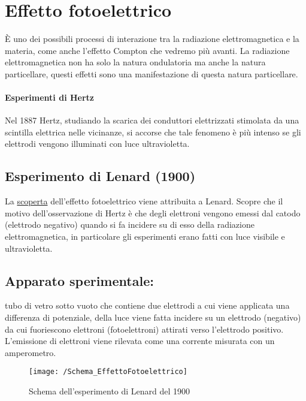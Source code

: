 

\section{Effetto fotoelettrico}
È uno dei possibili processi di interazione tra la radiazione elettromagnetica e la materia, come anche l'effetto Compton che vedremo più avanti. La radiazione elettromagnetica non ha solo la natura ondulatoria ma anche la natura particellare, questi effetti sono una manifestazione di questa natura particellare.

\paragraph{Esperimenti di Hertz}
Nel 1887 Hertz, studiando la scarica dei conduttori elettrizzati stimolata da una scintilla elettrica nelle vicinanze,
si accorse che tale fenomeno è più intenso se gli elettrodi vengono illuminati con luce ultravioletta.

\subsection{Esperimento di Lenard (1900)}
La \underline{scoperta} dell'effetto fotoelettrico viene attribuita a Lenard.
Scopre che il motivo dell'osservazione di Hertz è che degli elettroni vengono emessi dal catodo (elettrodo negativo) quando si fa incidere su di esso della radiazione elettromagnetica, in particolare gli esperimenti erano fatti con luce visibile e ultravioletta.
\subsection{Apparato sperimentale:} tubo di vetro sotto vuoto che contiene due elettrodi a cui viene applicata una differenza di potenziale, della luce viene fatta incidere su un elettrodo (negativo) da cui fuoriescono elettroni (fotoelettroni) attirati verso l'elettrodo positivo.
 L'emissione di elettroni viene rilevata come una corrente misurata con un amperometro.

\begin{figure}[h]
\centering
\texttt{[image: /Schema\_EffettoFotoelettrico]}
\caption{Schema dell'esperimento di Lenard del 1900}
\end{figure}

